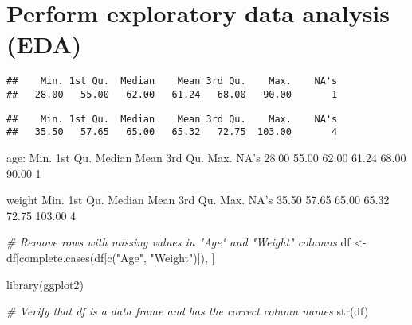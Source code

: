\documentclass[
]{article}
\newenvironment{Shaded}{\begin{snugshade}}{\end{snugshade}}
\newcommand{\CommentTok}[1]{\textcolor[rgb]{0.56,0.35,0.01}{\textit{#1}}}
\newcommand{\FunctionTok}[1]{\textcolor[rgb]{0.00,0.00,0.00}{#1}}
\newcommand{\NormalTok}[1]{#1}
\newcommand{\OtherTok}[1]{\textcolor[rgb]{0.56,0.35,0.01}{#1}}
\newcommand{\SpecialCharTok}[1]{\textcolor[rgb]{0.00,0.00,0.00}{#1}}
\newcommand{\StringTok}[1]{\textcolor[rgb]{0.31,0.60,0.02}{#1}}
\begin{document}
\hypertarget{perform-exploratory-data-analysis-eda}{%
\section{Perform exploratory data analysis
(EDA)}\label{perform-exploratory-data-analysis-eda}}

\begin{Shaded}
\end{Shaded}

\begin{verbatim}
##    Min. 1st Qu.  Median    Mean 3rd Qu.    Max.    NA's 
##   28.00   55.00   62.00   61.24   68.00   90.00       1
\end{verbatim}

\begin{Shaded}
\end{Shaded}

\begin{verbatim}
##    Min. 1st Qu.  Median    Mean 3rd Qu.    Max.    NA's 
##   35.50   57.65   65.00   65.32   72.75  103.00       4
\end{verbatim}

age: Min. 1st Qu. Median Mean 3rd Qu. Max. NA's 28.00 55.00 62.00 61.24
68.00 90.00 1

weight Min. 1st Qu. Median Mean 3rd Qu. Max. NA's 35.50 57.65 65.00
65.32 72.75 103.00 4

\begin{Shaded}
\begin{Highlighting}[]
\CommentTok{\# Remove rows with missing values in "Age" and "Weight" columns}
\NormalTok{df }\OtherTok{\textless{}{-}}\NormalTok{ df[}\FunctionTok{complete.cases}\NormalTok{(df[}\FunctionTok{c}\NormalTok{(}\StringTok{"Age"}\NormalTok{, }\StringTok{"Weight"}\NormalTok{)]), ]}
\end{Highlighting}
\end{Shaded}

\begin{Shaded}
\begin{Highlighting}[]
\FunctionTok{library}\NormalTok{(ggplot2)}

\CommentTok{\# Verify that df is a data frame and has the correct column names}
\FunctionTok{str}\NormalTok{(df)}
\end{Highlighting}
\end{Shaded}
\end{document}
